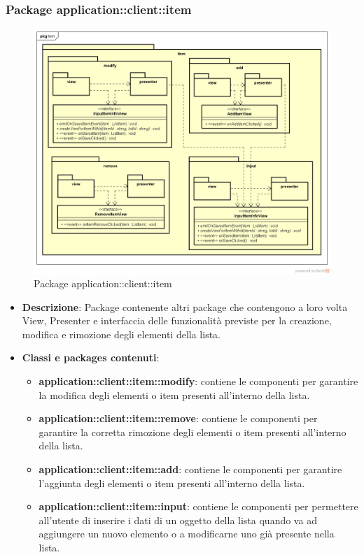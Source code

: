\subsubsection{Package application::client::item}
\label{Package application::client::item}
\begin{figure}[H]
	\centering
	\includegraphics[scale=0.5]{Sezioni/Packages/App/pck_client_item.png}
	\caption{Package application::client::item}
\end{figure}
\begin{itemize}
	\item \textbf{Descrizione}: Package contenente altri package che contengono a loro volta View, Presenter e interfaccia delle funzionalità previste per la creazione, modifica e rimozione degli elementi della lista.
	\item \textbf{Classi e packages contenuti}:
	\begin{itemize}
	\item \textbf{application::client::item::modify}: contiene le componenti per garantire la modifica degli elementi o item presenti all'interno della lista.
	\item \textbf{application::client::item::remove}: contiene le componenti per garantire la corretta rimozione degli elementi o item presenti all'interno della lista.
	\item \textbf{application::client::item::add}: 
	contiene le componenti per garantire l'aggiunta degli elementi o item presenti all'interno della lista.
	\item \textbf{application::client::item::input}:
	contiene le componenti per permettere all'utente di inserire i dati di un oggetto della lista quando va ad aggiungere un nuovo elemento o a modificarne uno già presente nella lista.
\end{itemize}
\end{itemize}

